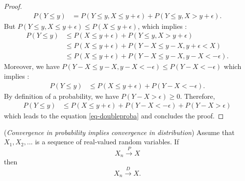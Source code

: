\documentclass{article}
\begin{document}
\begin{proof}
\begin{align*}
P(Y\leq y)
& = P(Y\leq y,X\leq y+\epsilon)+P(Y\leq y,X> y+\epsilon).
\end{align*}
But $P(Y\leq y,X\leq y+\epsilon) \leq P(X\leq y+\epsilon)$, which implies :
\begin{align*}
P(Y\leq y)
& \leq P(X\leq y+\epsilon)+P(Y\leq y,X> y+\epsilon) \\
& \leq P(X\leq y+\epsilon)+P(Y-X\leq y-X, y+\epsilon<X) \\
& \leq P(X\leq y+\epsilon)+P(Y-X\leq y-X, y-X <-\epsilon).
\end{align*}
Moreover, we have $P(Y-X\leq y-X, y-X <-\epsilon)\leq P(Y-X<-\epsilon)$ which implies : 
\begin{align*}
P(Y\leq y)
& \leq P(X\leq y+\epsilon)+P(Y-X<-\epsilon).
\end{align*}
By definition of a probability, we have $P(Y-X>\epsilon)\geq 0$. 
Therefore, 
\begin{align*}
P(Y\leq y)
& \leq P(X\leq y+\epsilon)+P(Y-X<-\epsilon) + P(Y-X>\epsilon)
\end{align*}
which leads to the equation \ref{eq-doubleproba} and concludes the proof.
\end{proof}


\begin{theorem}
\label{theo-convprovdist}
(\emph{Convergence in probability implies convergence in distribution})
Assume that $X_1,X_2,...$ is a sequence of real-valued random variables. 
If 
$$
X_n \xrightarrow{P} X
$$
then
$$
X_n \xrightarrow{D} X.
$$
\end{theorem}
\end{document}
